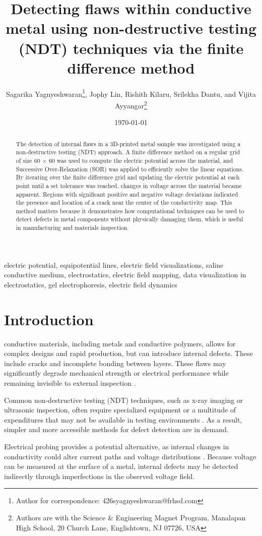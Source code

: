 \documentclass[10pt,journal,twoside]{IEEEtran} %
\title{Detecting flaws within conductive metal using non-destructive testing (NDT) techniques via the finite difference method} %
\author{Sagarika Yagnyeshwaran\thanks{Author for correspondence: 426syagnyeshwaran@frhsd.com}, Jophy Lin, Rishith Kilaru, Srilekha Dantu, and Vijita Ayyangar\thanks{Authors are with the Science \& Engineering Magnet Program, Manalapan High School, 20 Church Lane, Englishtown, NJ 07726, USA}} %
\date{\today}
\newcommand{\keywords}{electric potential, equipotential lines, electric field visualizations, saline conductive medium, electrostatics, electric field mapping, data visualization in electrostatics, gel electrophoresis, electric field dynamics} %
\begin{document}
\maketitle

\begin{abstract}
The detection of internal flaws in a 3D-printed metal sample was investigated using a non-destructive testing (NDT) approach. A finite difference method on a regular grid of size 60 $\times$ 60 was used to compute the electric potential across the material, and Successive Over-Relaxation (SOR) was applied to efficiently solve the linear equations. By iterating over the finite difference grid and updating the electric potential at each point until a set tolerance was reached, changes in voltage across the material became apparent. Regions with significant positive and negative voltage deviations indicated the presence and location of a crack near the center of the conductivity map. This method matters because it demonstrates how computational techniques can be used to detect defects in metal components without physically damaging them, which is useful in manufacturing and materials inspection.
\end{abstract}

\begin{IEEEkeywords}
\keywords
\end{IEEEkeywords}


\section{Introduction}
 conductive materials, including metals and conductive polymers, allows for complex designs and rapid production, but can introduce internal defects. These include cracks and incomplete bonding between layers. These flaws may significantly degrade mechanical strength or electrical performance while remaining invisible to external inspection \cite{dalal:2019:cracks}.

Common non-destructive testing (NDT) techniques, such as x-ray imaging or ultrasonic inspection, often require specialized equipment or a multitude of expenditures that may not be available in testing environments \cite{cawley:2001:nondestructive,davis:2004:nondestructive}. As a result, simpler and more accessible methods for defect detection are in demand.

Electrical probing provides a potential alternative, as internal changes in conductivity could alter current paths and voltage distributions \cite{hauptmann:2018:revealing}. Because voltage can be measured at the surface of a metal, internal defects may be detected indirectly through imperfections in the observed voltage field.
\end{document}
